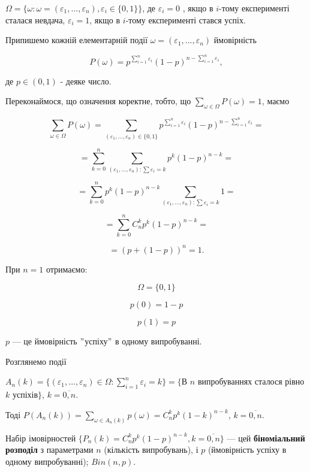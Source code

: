 $\Omega = \{\omega: \omega = (\varepsilon_1, ..., \varepsilon_n), \varepsilon_i \in \{0, 1\}\}$, 
де $\varepsilon_i = 0$ , якщо в $i$-тому експерименті сталася невдача, $\varepsilon_i = 1$, якщо
в $i$-тому експерименті стався успіх.

Припишемо кожній елементарній події $\omega = (\varepsilon_1, ..., \varepsilon_n)$ ймовірність

$$P(\omega) = p^{\sum\limits_{i=1}^n \varepsilon_i} (1-p)^{n - \sum\limits_{i=1}^n \varepsilon_i},$$

де $p \in (0, 1)$ - деяке число.

Переконаймося, що означення коректне, тобто, що $\sum\limits_{\omega \in \Omega} P(\omega) = 1$, маємо

$$\sum\limits_{\omega \in \Omega} P(\omega)
= \sum\limits_{(\varepsilon_1, ..., \varepsilon_n) \in \{0, 1\}}
    p^{\sum\limits_{i=1}^n \varepsilon_i}
    (1-p)^{n - \sum\limits_{i=1}^n \varepsilon_i} =$$

$$= \sum\limits_{k=0}^n \sum\limits_{(\varepsilon_1, ..., \varepsilon_n) : \sum \varepsilon_i = k}
    p^k (1-p)^{n-k} = $$

$$= \sum\limits_{k=0}^n p^k (1-p)^{n-k} \sum\limits_{(\varepsilon_1, ..., \varepsilon_n) : \sum \varepsilon_i = k} 1 =$$

$$= \sum\limits_{k=0}^n C_n^kp^k(1-p)^{n-k} =$$

$$= (p+(1-p))^n = 1.$$

При $n=1$ отримаємо:

$$\Omega = \{0, 1\}$$

$$p(0) = 1-p$$

$$p(1) = p$$

$p$ --- це ймовірність $"$успіху$"$ в одному випробуванні.

Розглянемо події

$A_n(k) = \{(\varepsilon_1, ..., \varepsilon_n) \in \Omega: \sum\limits_{i=1}^n \varepsilon_i = k\}
= \{$В $n$ випробуваннях сталося рівно $k$ успіхів$\}$, $k = \overline{0,n}$.

Тоді $P(A_n(k)) = \sum\limits_{\omega \in A_n(k)} p(\omega) = C_n^k p^k (1-k)^{n-k}$,
$k = \overline{0, n}$.

\begin{definition}
    Набір імовірностей $\{P_n(k) = C_n^kp^k(1-p)^{n-k}, k = \overline{0, n}\}$ --- цей
    \textbf{біноміальний розподіл} з параметрами $n$ (кількість випробувань), і  $p$
    (ймовірність успіху в одному випробуванні); $Bin(n,p)$.
\end{definition}

